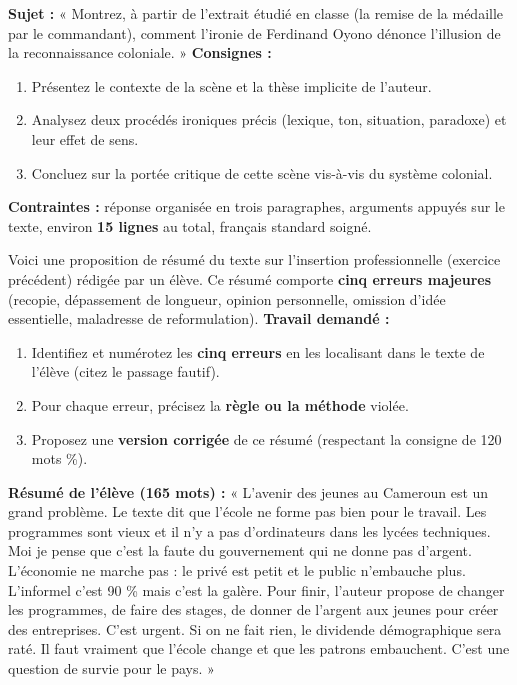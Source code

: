 \documentclass[11pt]{article}
\begin{document}
\begin{exercice}
\textbf{Sujet :} « Montrez, à partir de l'extrait étudié en classe (la remise de la médaille par le commandant), comment l'ironie de Ferdinand Oyono dénonce l'illusion de la reconnaissance coloniale. »
\textbf{Consignes :}
\begin{enumerate}
    \item Présentez le contexte de la scène et la thèse implicite de l'auteur.
    \item Analysez deux procédés ironiques précis (lexique, ton, situation, paradoxe) et leur effet de sens.
    \item Concluez sur la portée critique de cette scène vis-à-vis du système colonial.
\end{enumerate}
\textbf{Contraintes :} réponse organisée en trois paragraphes, arguments appuyés sur le texte, environ \textbf{15 lignes} au total, français standard soigné.
\end{exercice}

\begin{exercice}
Voici une proposition de résumé du texte sur l'insertion professionnelle (exercice précédent) rédigée par un élève. Ce résumé comporte \textbf{cinq erreurs majeures} (recopie, dépassement de longueur, opinion personnelle, omission d'idée essentielle, maladresse de reformulation).
\textbf{Travail demandé :}
\begin{enumerate}
    \item Identifiez et numérotez les \textbf{cinq erreurs} en les localisant dans le texte de l'élève (citez le passage fautif).
    \item Pour chaque erreur, précisez la \textbf{règle ou la méthode} violée.
    \item Proposez une \textbf{version corrigée} de ce résumé (respectant la consigne de 120 mots  \%).
\end{enumerate}

\textbf{Résumé de l'élève (165 mots) :}
« L'avenir des jeunes au Cameroun est un grand problème. Le texte dit que l'école ne forme pas bien pour le travail. Les programmes sont vieux et il n'y a pas d'ordinateurs dans les lycées techniques. Moi je pense que c'est la faute du gouvernement qui ne donne pas d'argent. L'économie ne marche pas : le privé est petit et le public n'embauche plus. L'informel c'est 90 \% mais c'est la galère. Pour finir, l'auteur propose de changer les programmes, de faire des stages, de donner de l'argent aux jeunes pour créer des entreprises. C'est urgent. Si on ne fait rien, le dividende démographique sera raté. Il faut vraiment que l'école change et que les patrons embauchent. C'est une question de survie pour le pays. »
\end{exercice}
\end{document}
